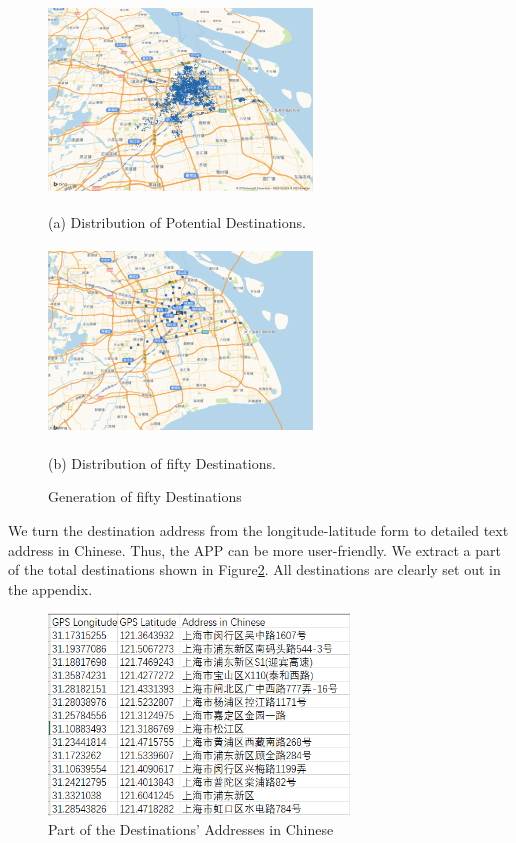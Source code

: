 \documentclass{mcmthesis}
\begin{document}
\begin{figure}[htbp]
    \begin{minipage}{0.44\linewidth}
      \centerline{\includegraphics[height=5cm,width=7cm]{figures/PotentialDetinations.png}}
      \caption*{(a) Distribution of Potential Destinations.}
    \end{minipage}
    \hspace{0.5in}
    \begin{minipage}{0.44\linewidth}
      \centerline{\includegraphics[height=5cm,width=7cm]{figures/fiftydestinations.png}}
      \caption*{(b) Distribution of fifty Destinations.}
    \end{minipage}
    \caption{Generation of fifty Destinations}
    \label{fig:twoII}
\end{figure}




We turn the destination address from the longitude-latitude form to detailed text address in Chinese. Thus, the APP can be more user-friendly. We extract a part of the total destinations shown in Figure\ref{fig:AIC}. All destinations are clearly set out in the appendix.

\begin{figure}[htbp]
    \centering
    \includegraphics[width=8cm]{figures/AddressinChinese.png}
    \caption{Part of the Destinations' Addresses in Chinese}
    \label{fig:AIC}
\end{figure}
\end{document}
